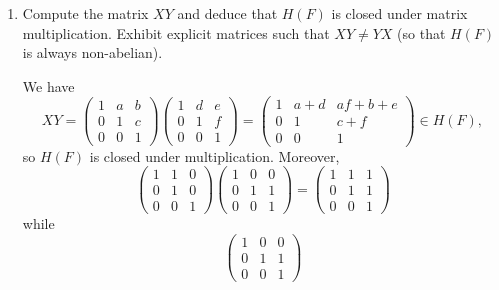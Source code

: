 \begin{enumerate}
\item Compute the matrix $XY$ and deduce that $H(F)$ is closed under
  matrix multiplication. Exhibit explicit matrices such that
  $XY\neq YX$ (so that $H(F)$ is always non-abelian).
  \begin{solution}
    We have
    \begin{equation*}
      XY =
      \begin{pmatrix}
        1 & a & b \\
        0 & 1 & c \\
        0 & 0 & 1
      \end{pmatrix}
      \begin{pmatrix}
        1 & d & e \\
        0 & 1 & f \\
        0 & 0 & 1
      \end{pmatrix}
      =
      \begin{pmatrix}
        1 & a + d & af + b + e \\
        0 & 1 & c + f \\
        0 & 0 & 1
      \end{pmatrix}
      \in H(F),
    \end{equation*}
    so $H(F)$ is closed under multiplication. Moreover,
    \begin{equation*}
      \begin{pmatrix}
        1 & 1 & 0 \\
        0 & 1 & 0 \\
        0 & 0 & 1
      \end{pmatrix}
      \begin{pmatrix}
        1 & 0 & 0 \\
        0 & 1 & 1 \\
        0 & 0 & 1
      \end{pmatrix}
      =
      \begin{pmatrix}
        1 & 1 & 1 \\
        0 & 1 & 1 \\
        0 & 0 & 1
      \end{pmatrix}
    \end{equation*}
    while
    \begin{equation*}
      \begin{pmatrix}
        1 & 0 & 0 \\
        0 & 1 & 1 \\
        0 & 0 & 1
      \end{pmatrix}

\end{equation*}
\end{solution}
\end{enumerate}
